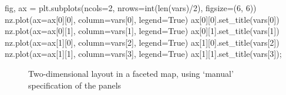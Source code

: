\documentclass[
  letterpaper,
]{krantz}
\newenvironment{Shaded}{\begin{snugshade}}{\end{snugshade}}
\newcommand{\BuiltInTok}[1]{\textcolor[rgb]{0.00,0.23,0.31}{#1}}
\newcommand{\DecValTok}[1]{\textcolor[rgb]{0.68,0.00,0.00}{#1}}
\newcommand{\NormalTok}[1]{\textcolor[rgb]{0.00,0.23,0.31}{#1}}
\newcommand{\OperatorTok}[1]{\textcolor[rgb]{0.37,0.37,0.37}{#1}}
\newcommand{\VariableTok}[1]{\textcolor[rgb]{0.07,0.07,0.07}{#1}}
\begin{document}
\begin{Shaded}
\begin{Highlighting}[]
\NormalTok{fig, ax }\OperatorTok{=}\NormalTok{ plt.subplots(ncols}\OperatorTok{=}\DecValTok{2}\NormalTok{, nrows}\OperatorTok{=}\BuiltInTok{int}\NormalTok{(}\BuiltInTok{len}\NormalTok{(}\BuiltInTok{vars}\NormalTok{)}\OperatorTok{/}\DecValTok{2}\NormalTok{), figsize}\OperatorTok{=}\NormalTok{(}\DecValTok{6}\NormalTok{, }\DecValTok{6}\NormalTok{))}
\NormalTok{nz.plot(ax}\OperatorTok{=}\NormalTok{ax[}\DecValTok{0}\NormalTok{][}\DecValTok{0}\NormalTok{], column}\OperatorTok{=}\BuiltInTok{vars}\NormalTok{[}\DecValTok{0}\NormalTok{], legend}\OperatorTok{=}\VariableTok{True}\NormalTok{)}
\NormalTok{ax[}\DecValTok{0}\NormalTok{][}\DecValTok{0}\NormalTok{].set\_title(}\BuiltInTok{vars}\NormalTok{[}\DecValTok{0}\NormalTok{])}
\NormalTok{nz.plot(ax}\OperatorTok{=}\NormalTok{ax[}\DecValTok{0}\NormalTok{][}\DecValTok{1}\NormalTok{], column}\OperatorTok{=}\BuiltInTok{vars}\NormalTok{[}\DecValTok{1}\NormalTok{], legend}\OperatorTok{=}\VariableTok{True}\NormalTok{)}
\NormalTok{ax[}\DecValTok{0}\NormalTok{][}\DecValTok{1}\NormalTok{].set\_title(}\BuiltInTok{vars}\NormalTok{[}\DecValTok{1}\NormalTok{])}
\NormalTok{nz.plot(ax}\OperatorTok{=}\NormalTok{ax[}\DecValTok{1}\NormalTok{][}\DecValTok{0}\NormalTok{], column}\OperatorTok{=}\BuiltInTok{vars}\NormalTok{[}\DecValTok{2}\NormalTok{], legend}\OperatorTok{=}\VariableTok{True}\NormalTok{)}
\NormalTok{ax[}\DecValTok{1}\NormalTok{][}\DecValTok{0}\NormalTok{].set\_title(}\BuiltInTok{vars}\NormalTok{[}\DecValTok{2}\NormalTok{])}
\NormalTok{nz.plot(ax}\OperatorTok{=}\NormalTok{ax[}\DecValTok{1}\NormalTok{][}\DecValTok{1}\NormalTok{], column}\OperatorTok{=}\BuiltInTok{vars}\NormalTok{[}\DecValTok{3}\NormalTok{], legend}\OperatorTok{=}\VariableTok{True}\NormalTok{)}
\NormalTok{ax[}\DecValTok{1}\NormalTok{][}\DecValTok{1}\NormalTok{].set\_title(}\BuiltInTok{vars}\NormalTok{[}\DecValTok{3}\NormalTok{])}\OperatorTok{;}
\end{Highlighting}
\end{Shaded}

\begin{figure}[H]


\caption{\label{fig-faceted-map3}Two-dimensional layout in a faceted
map, using `manual' specification of the panels}

\end{figure}%
\end{document}
